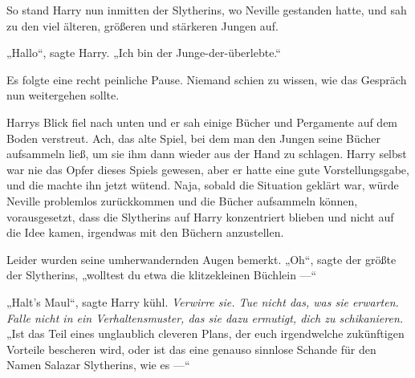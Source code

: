 So stand Harry nun inmitten der Slytherins, wo Neville gestanden hatte, und sah zu den viel älteren, größeren und stärkeren Jungen auf.

„Hallo“, sagte Harry.
„Ich bin der Junge-der-überlebte.“

Es folgte eine recht peinliche Pause. Niemand schien zu wissen, wie das Gespräch nun weitergehen sollte.

Harrys Blick fiel nach unten und er sah einige Bücher und Pergamente auf dem Boden verstreut. Ach, das alte Spiel, bei dem man den Jungen seine Bücher aufsammeln ließ, um sie ihm dann wieder aus der Hand zu schlagen. Harry selbst war nie das Opfer dieses Spiels gewesen, aber er hatte eine gute Vorstellungsgabe, und die machte ihn jetzt wütend. Naja, sobald die Situation geklärt war, würde Neville problemlos zurückkommen und die Bücher aufsammeln können, vorausgesetzt, dass die Slytherins auf Harry konzentriert blieben und nicht auf die Idee kamen, irgendwas mit den Büchern anzustellen.

Leider wurden seine umherwandernden Augen bemerkt.
„Oh“, sagte der größte der Slytherins, „wolltest du etwa die klitzekleinen Büchlein —“

„Halt’s Maul“, sagte Harry kühl. \emph{Verwirre sie. Tue nicht das, was sie erwarten. Falle nicht in ein Verhaltensmuster, das sie dazu ermutigt, dich zu schikanieren.}
„Ist das Teil eines unglaublich cleveren Plans, der euch irgendwelche zukünftigen Vorteile bescheren wird, oder ist das eine genauso sinnlose Schande für den Namen Salazar Slytherins, wie es —“

